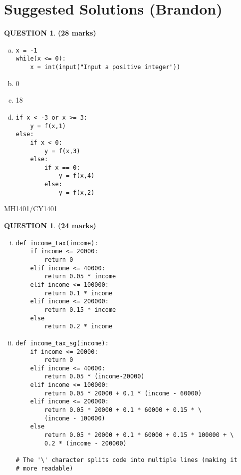\documentclass[a4paper,12pt]{article}
\theoremstyle{definition}
\newtheorem{ques}[dummy]{QUESTION}
\theoremstyle{plain}
\newcommand{\py}{python}
\begin{document}
\section*{Suggested Solutions (Brandon)}
\begin{ques}\hfill\textbf{(28 marks)}\\
	\begin{enumerate}[(a)]
		\item 
		\begin{verbatim}
x = -1
while(x <= 0):
    x = int(input("Input a positive integer"))
		\end{verbatim}
		\item 0
		\item 18
		\item 
\begin{verbatim}
if x < -3 or x >= 3:
    y = f(x,1)
else:
    if x < 0:
        y = f(x,3)
    else:
        if x == 0:
            y = f(x,4)
        else:
            y = f(x,2)
\end{verbatim}
	\end{enumerate}
\end{ques}

\newpage
\hfill MH1401/CY1401\vspace*{0.5em}
\begin{ques}\hfill \textbf{(24 marks)}\\
	\begin{enumerate}[(i)]
		\item 
		\begin{verbatim}
def income_tax(income):
    if income <= 20000:
        return 0
    elif income <= 40000:
        return 0.05 * income
    elif income <= 100000:
        return 0.1 * income
    elif income <= 200000:
        return 0.15 * income
    else
        return 0.2 * income
		\end{verbatim}
		
		
		\item 
		\begin{verbatim}
def income_tax_sg(income):
    if income <= 20000:
        return 0
    elif income <= 40000:
        return 0.05 * (income-20000)
    elif income <= 100000:
        return 0.05 * 20000 + 0.1 * (income - 60000)
    elif income <= 200000:
        return 0.05 * 20000 + 0.1 * 60000 + 0.15 * \
        (income - 100000)
    else
        return 0.05 * 20000 + 0.1 * 60000 + 0.15 * 100000 + \ 
        0.2 * (income - 200000)

# The '\' character splits code into multiple lines (making it 
# more readable)
		\end{verbatim}
	\end{enumerate}
\end{ques}
\end{document}
